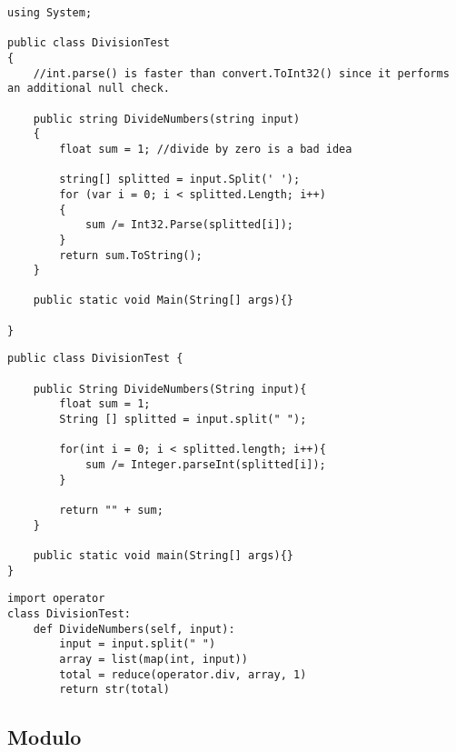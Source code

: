 	\lstset{style=sharpc}
	\begin{lstlisting}
using System;

public class DivisionTest
{
    //int.parse() is faster than convert.ToInt32() since it performs an additional null check.

    public string DivideNumbers(string input)
    {
        float sum = 1; //divide by zero is a bad idea

        string[] splitted = input.Split(' ');
        for (var i = 0; i < splitted.Length; i++)
        {
            sum /= Int32.Parse(splitted[i]);
        }
        return sum.ToString();
    }

	public static void Main(String[] args){}

}

	\end{lstlisting}

	\lstset{style=java}
	\begin{lstlisting}
public class DivisionTest {

	public String DivideNumbers(String input){
		float sum = 1;
		String [] splitted = input.split(" ");

		for(int i = 0; i < splitted.length; i++){
			sum /= Integer.parseInt(splitted[i]);
		}

		return "" + sum;
	}

	public static void main(String[] args){}
}
	\end{lstlisting}


	\lstset{style=python}
	\begin{lstlisting}
import operator
class DivisionTest:
    def DivideNumbers(self, input):
        input = input.split(" ")
        array = list(map(int, input))
        total = reduce(operator.div, array, 1)
        return str(total)
	\end{lstlisting}



\subsection{Modulo}

